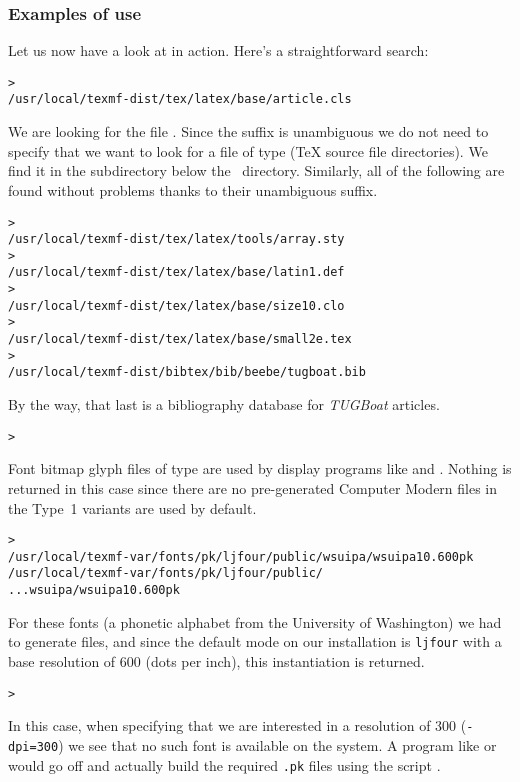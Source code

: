 \documentclass{article}
\begin{document}
\subsubsection{Examples of use}
\label{sec:examples-of-use}

Let us now have a look at \KPS{} in action.  Here's a straightforward search:

\begin{alltt}
> 
   /usr/local/texmf-dist/tex/latex/base/article.cls
\end{alltt}
We are looking for the file . Since the 
suffix is unambiguous we do not need to specify that we want to look for a
file of type  (\TeX{} source file directories). We find it in
the subdirectory  below the  \TL\
directory.  Similarly, all of the following are found without problems
thanks to their unambiguous suffix.
\begin{alltt}
> 
   /usr/local/texmf-dist/tex/latex/tools/array.sty
> 
   /usr/local/texmf-dist/tex/latex/base/latin1.def
> 
   /usr/local/texmf-dist/tex/latex/base/size10.clo
> 
   /usr/local/texmf-dist/tex/latex/base/small2e.tex
> 
   /usr/local/texmf-dist/bibtex/bib/beebe/tugboat.bib
\end{alltt}

By the way, that last is a \BibTeX{} bibliography database for \textsl{TUGBoat} articles.

\begin{alltt}
> 
\end{alltt}
Font bitmap glyph files of type  are used by display
programs like  and .  Nothing is returned in
this case since there are no pre-generated Computer Modern \samp{.pk}
files in \TL{}\Dash the Type~1 variants are used by default.
\begin{alltt}
> 
\ifSingleColumn   /usr/local/texmf-var/fonts/pk/ljfour/public/wsuipa/wsuipa10.600pk
\else /usr/local/texmf-var/fonts/pk/ljfour/public/
...                         wsuipa/wsuipa10.600pk
\fi\end{alltt}
For these fonts (a phonetic alphabet from the University of Washington)
we had to generate \samp{.pk} files, and since the default \MF{} mode on
our installation is \texttt{ljfour} with a base resolution of 600\dpi{}
(dots per inch), this instantiation is returned.
\begin{alltt}
> 
\end{alltt}
In this case, when specifying that we are interested in a resolution
of 300\dpi{} (\texttt{-dpi=300}) we see that no such font is available on
the system. A program like \cmdname{dvips} or \cmdname{xdvi} would
go off and actually build the required \texttt{.pk} files
using the script .
\end{document}

